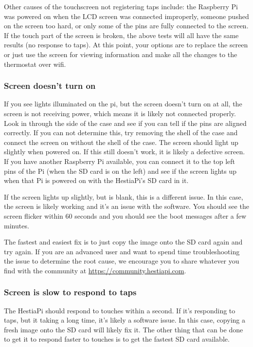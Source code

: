 Other causes of the touchscreen not registering taps include: the Raspberry Pi
was powered on when the LCD screen was connected improperly, someone pushed on
the screen too hard, or only some of the pins are fully connected to the
screen. If the touch part of the screen is broken, the above tests will all
have the same results (no response to taps). At this point, your options are to
replace the screen or just use the screen for viewing information and make all
the changes to the thermostat over wifi.

\subsubsection{Screen doesn't turn on}
If you see lights illuminated on the pi, but the screen doesn't turn on at all,
the screen is not receiving power, which means it is likely not connected
properly. Look in through the side of the case and see if you can tell if the
pins are aligned correctly. If you can not determine this, try removing the
shell of the case and connect the screen on without the shell of the case. The
screen should light up slightly when powered on. If this still doesn't work, it
is likely a defective screen. If you have another Raspberry Pi available, you
can connect it to the top left pins of the Pi (when the SD card is on the left)
and see if the screen lights up when that Pi is powered on with the HestiaPi's
SD card in it.

If the screen lights up slightly, but is blank, this is a different issue. In
this case, the screen is likely working and it's an issue with the software.
You should see the screen flicker within 60 seconds and you should see the
boot messages after a few minutes.

The fastest and easiest fix is to just copy the image onto the SD card again
and try again. If you are an advanced user and want to spend time
troubleshooting the issue to determine the root cause, we encourage you to
share whatever you find with the community at
\url{https://community.hestiapi.com}.

\subsubsection{Screen is slow to respond to taps}
The HestiaPi should respond to touches within a second. If it's responding
to taps, but it taking a long time, it's likely a software issue. In this
case, copying a fresh image onto the SD card will likely fix it. The other
thing that can be done to get it to respond faster to touches is to get the
fastest SD card available.


